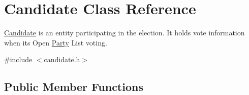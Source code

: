 \hypertarget{classCandidate}{}\section{Candidate Class Reference}
\label{classCandidate}


\hyperlink{classCandidate}{Candidate} is an entity participating in the election. It holds vote information when it\textquotesingle{}s Open \hyperlink{classParty}{Party} List voting.  




{\ttfamily \#include $<$candidate.\+h$>$}

\subsection*{Public Member Functions}
